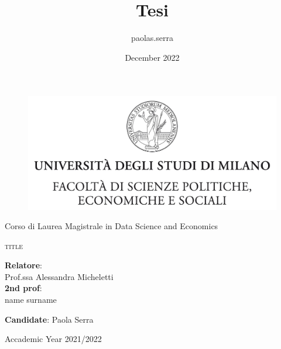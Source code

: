 \documentclass{article}
\title{Tesi}
\author{paolas.serra }
\date{December 2022}
\begin{document}
\begin{titlepage}
\begin{center}
\begin{figure}[H]
\centering
\includegraphics[width=130mm]{images/tesiSCIENZE_POLITICHE.jpg}
\end{figure}    
\end{center}
\begin{center}
{\Large {Corso di Laurea Magistrale in Data Science and Economics} }
\end{center}
\vspace{0,8 cm}
\begin{center}
{\Large \textsc{title} }
\end{center}
\par
  \vspace{1 cm}
  \begin{flushleft}
  		 \textbf{Relatore}:\\ Prof.ssa Alessandra Micheletti\\
  		 \noindent \textbf{2nd prof}:\\ name surname\\
  \end{flushleft}
\par
  \vspace{0 cm}
  \begin{flushright}
  	\textbf{Candidate}: Paola Serra 
  \end{flushright}
\vspace{0,9 cm}    	  
\vfill
\begin{center}
	{\large Accademic Year 2021/2022}
\end{center}
\end{titlepage}

\break
\tableofcontents
\vspace{1.5cm}
\listoffigures
\vspace{1.5cm}
\listoftables
\break

\newpage
\end{document}
